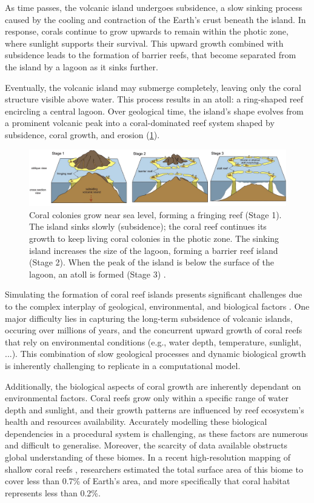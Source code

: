 As time passes, the volcanic island undergoes subsidence, a slow sinking process caused by the cooling and contraction of the Earth's crust beneath the island. In response, corals continue to grow upwards to remain within the photic zone, where sunlight supports their survival. This upward growth combined with subsidence leads to the formation of barrier reefs, that become separated from the island by a lagoon as it sinks further.

Eventually, the volcanic island may submerge completely, leaving only the coral structure visible above water. This process results in an atoll: a ring-shaped reef encircling a central lagoon. Over geological time, the island's shape evolves from a prominent volcanic peak into a coral-dominated reef system shaped by subsidence, coral growth, and erosion (\cref{fig:coral-island-reef-growth}).

\begin{figure}[H]
    \includegraphics[width = \linewidth]{other_images/Drawings/Darwin_corals-color-Terry2012.jpg}
    \caption{Coral colonies grow near sea level, forming a fringing reef (Stage 1). The island sinks slowly (subsidence); the coral reef continues its growth to keep living coral colonies in the photic zone. The sinking island increases the size of the lagoon, forming a barrier reef island (Stage 2). When the peak of the island is below the surface of the lagoon, an atoll is formed (Stage 3) \cite{Terry2013}.}
    \label{fig:coral-island-reef-growth}
\end{figure}

Simulating the formation of coral reef islands presents significant challenges due to the complex interplay of geological, environmental, and biological factors \cite{Hopley2014}. One major difficulty lies in capturing the long-term subsidence of volcanic islands, occuring over millions of years, and the concurrent upward growth of coral reefs that rely on environmental conditions (e.g., water depth, temperature, sunlight, ...). This combination of slow geological processes and dynamic biological growth is inherently challenging to replicate in a computational model.

Additionally, the biological aspects of coral growth are inherently dependant on environmental factors. Coral reefs grow only within a specific range of water depth and sunlight, and their growth patterns are influenced by reef ecosystem's health and resources availability. Accurately modelling these biological dependencies in a procedural system is challenging, as these factors are numerous and difficult to generalise. Moreover, the scarcity of data available obstructs global understanding of these biomes. In a recent high-resolution mapping of shallow coral reefs \cite{Lyons2024}, researchers estimated the total surface area of this biome to cover less than 0.7\% of Earth's area, and more specifically that coral habitat represents less than 0.2\%.

